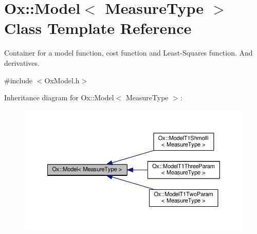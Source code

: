 \hypertarget{class_ox_1_1_model}{}\section{Ox\+:\+:Model$<$ Measure\+Type $>$ Class Template Reference}
\label{class_ox_1_1_model}


Container for a model function, cost function and Least-\/\+Squares function. And derivatives.  




{\ttfamily \#include $<$Ox\+Model.\+h$>$}



Inheritance diagram for Ox\+:\+:Model$<$ Measure\+Type $>$\+:
\nopagebreak
\begin{figure}[H]
\begin{center}
\leavevmode
\includegraphics[width=350pt]{class_ox_1_1_model__inherit__graph}
\end{center}
\end{figure}
